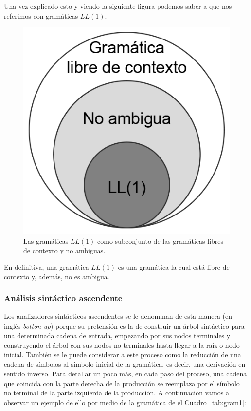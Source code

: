 \documentclass{article}
\begin{document}
    Una vez explicado esto y viendo la siguiente figura podemos saber a que nos referimos con gramáticas $LL(1)$.
    \begin{figure}[H]
        \centering
        \includegraphics{imagesMem/LL1.png}
        \caption{Las gramáticas $LL(1)$ como subconjunto de las gramáticas libres de contexto y no ambiguas.}
    \end{figure}
    En definitiva, una gramática $LL(1)$ es una gramática la cual está libre de contexto y, además, no es ambigua.

    \subsubsection*{Análisis sintáctico ascendente}
    Los analizadores sintácticos ascendentes se le denominan de esta manera (en inglés \textit{botton-up}) porque su pretensión es
    la de construir un árbol sintáctico para una determinada cadena de entrada, empezando por sus nodos terminales y
    construyendo el árbol con sus nodos no terminales hasta llegar a la raíz o nodo inicial.
    También se le puede considerar a este proceso como la reducción de una cadena de símbolos al símbolo inicial de la
    gramática, es decir, una derivación en sentido inverso. Para detallar un poco más, en cada paso del proceso,
    una cadena que coincida con la parte derecha de la producción se reemplaza por el símbolo no terminal de la parte
    izquierda de la producción. A continuación vamos a observar un ejemplo de ello por medio de la gramática de el
    Cuadro~\ref{tab:gram1}:
\end{document}
